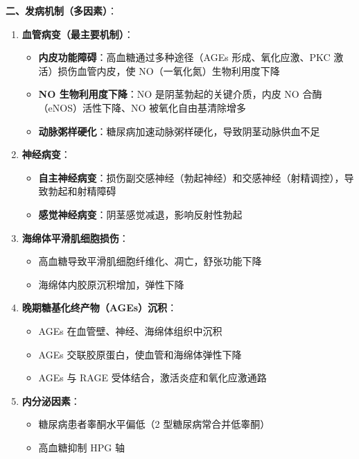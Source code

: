 \vspace{0.5em}
\noindent\textbf{二、发病机制（多因素）}：

\begin{enumerate}
	\item \textbf{血管病变（最主要机制）}：
	\begin{itemize}
		\item \textbf{内皮功能障碍}：高血糖通过多种途径（AGEs 形成、氧化应激、PKC 激活）损伤血管内皮，使 NO（一氧化氮）生物利用度下降
		\item \textbf{NO 生物利用度下降}：NO 是阴茎勃起的关键介质，内皮 NO 合酶（eNOS）活性下降、NO 被氧化自由基清除增多
		\item \textbf{动脉粥样硬化}：糖尿病加速动脉粥样硬化，导致阴茎动脉供血不足
	\end{itemize}

	\item \textbf{神经病变}：
	\begin{itemize}
		\item \textbf{自主神经病变}：损伤副交感神经（勃起神经）和交感神经（射精调控），导致勃起和射精障碍
		\item \textbf{感觉神经病变}：阴茎感觉减退，影响反射性勃起
	\end{itemize}

	\item \textbf{海绵体平滑肌细胞损伤}：
	\begin{itemize}
		\item 高血糖导致平滑肌细胞纤维化、凋亡，舒张功能下降
		\item 海绵体内胶原沉积增加，弹性下降
	\end{itemize}

	\item \textbf{晚期糖基化终产物（AGEs）沉积}：
	\begin{itemize}
		\item AGEs 在血管壁、神经、海绵体组织中沉积
		\item AGEs 交联胶原蛋白，使血管和海绵体弹性下降
		\item AGEs 与 RAGE 受体结合，激活炎症和氧化应激通路
	\end{itemize}

	\item \textbf{内分泌因素}：
	\begin{itemize}
		\item 糖尿病患者睾酮水平偏低（2 型糖尿病常合并低睾酮）
		\item 高血糖抑制 HPG 轴
	\end{itemize}
\end{enumerate}

